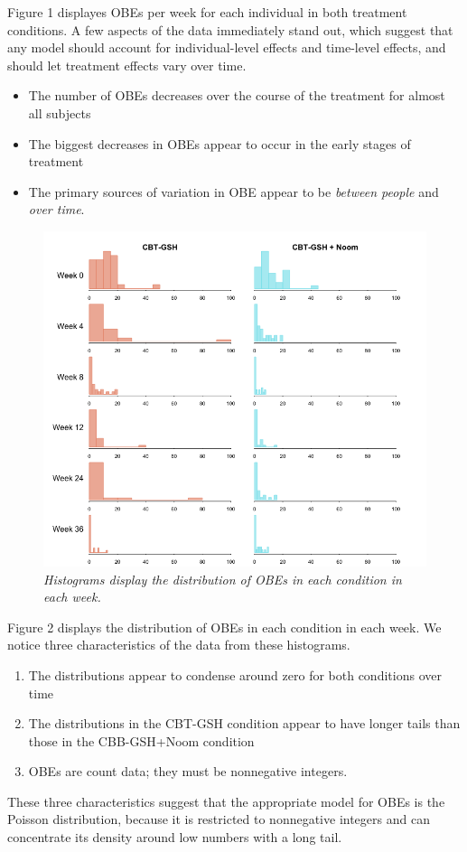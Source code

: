 \documentclass[12pt, oneside]{article}
\begin{document}
Figure 1 displayes OBEs per week for each individual in both treatment conditions.  A few aspects of the data immediately stand out, which suggest that any model should account for individual-level effects and time-level effects, and should let treatment effects vary over time.  
\begin{itemize}
\item{The number of OBEs decreases over the course of the treatment for almost all subjects}
\item{The biggest decreases in OBEs appear to occur in the early stages of treatment}
\item{The primary sources of variation in OBE appear to be \emph{between people} and \emph{over time}.}
\end{itemize}

\begin{figure}[h]
\centering
\includegraphics[width=\textwidth, height=\textheight, keepaspectratio]{noom_hist.png}
\caption{\emph{Histograms display the distribution of OBEs in each condition in each week.}}
\end{figure}

Figure 2 displays the distribution of OBEs in each condition in each week.  We notice three characteristics of the data from these histograms.
\begin{enumerate}
\item{The distributions appear to condense around zero for both conditions over time} 
\item{The distributions in the CBT-GSH condition appear to have longer tails than those in the CBB-GSH+Noom condition}
\item{OBEs are count data; they must be nonnegative integers.}
\end{enumerate}
These three characteristics suggest that the appropriate model for OBEs is the Poisson distribution, because it is restricted to nonnegative integers and can concentrate its density around low numbers with a long tail.
\end{document}
